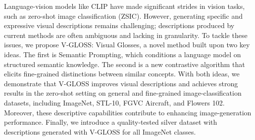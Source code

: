 Language-vision models like CLIP have made significant strides in vision tasks, such as zero-shot image classification (ZSIC). However, generating specific and expressive visual descriptions remains challenging; descriptions produced by current methods are often ambiguous and lacking in granularity. To tackle these issues, we propose V-GLOSS: Visual Glosses, a novel method built upon two key ideas. The first is Semantic Prompting, which conditions a language model on structured semantic knowledge. The second is a new contrastive algorithm that elicits fine-grained distinctions between similar concepts. With both ideas, we demonstrate that V-GLOSS improves visual descriptions and achieves strong results in the zero-shot setting on general and fine-grained image-classification datasets, including ImageNet, STL-10, FGVC Aircraft, and Flowers 102. Moreover, these descriptive capabilities contribute to enhancing image-generation performance. Finally, we introduce a quality-tested silver dataset with descriptions generated with V-GLOSS for all ImageNet classes.